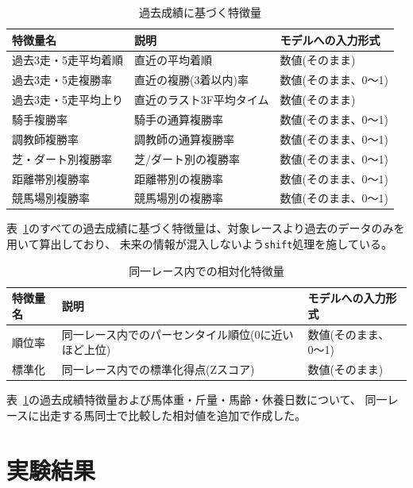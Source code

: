 \documentclass[dvipdfmx, a4paper, 11pt, titlepage]{jsarticle}
\begin{document}
\begin{table}[H]
  \centering
  \caption{過去成績に基づく特徴量}
  \label{tab:past_performance_features}
  \begin{tabular}{p{3.2cm}p{6.2cm}p{3.5cm}}
    \toprule
    特徴量名 & 説明 & モデルへの入力形式 \\
    \midrule
    過去3走・5走平均着順 & 直近の平均着順 & 数値(そのまま) \\
    過去3走・5走複勝率 & 直近の複勝(3着以内)率 & 数値(そのまま、0〜1) \\
    過去3走・5走平均上り & 直近のラスト3F平均タイム & 数値(そのまま) \\
    騎手複勝率 & 騎手の通算複勝率 & 数値(そのまま、0〜1) \\
    調教師複勝率 & 調教師の通算複勝率 & 数値(そのまま、0〜1) \\
    芝・ダート別複勝率 & 芝/ダート別の複勝率 & 数値(そのまま、0〜1) \\
    距離帯別複勝率 & 距離帯別の複勝率 & 数値(そのまま、0〜1) \\
    競馬場別複勝率 & 競馬場別の複勝率 & 数値(そのまま、0〜1) \\
    \bottomrule
  \end{tabular}
\end{table}

表~\ref{tab:past_performance_features}のすべての過去成績に基づく特徴量は、対象レースより過去のデータのみを用いて算出しており、
未来の情報が混入しないよう\texttt{shift}処理を施している。

\begin{table}[H]
  \centering
  \caption{同一レース内での相対化特徴量}
  \label{tab:relative_features}
  \begin{tabular}{p{3.2cm}p{6.2cm}p{3.5cm}}
    \toprule
    特徴量名 & 説明 & モデルへの入力形式 \\
    \midrule
    順位率 & 同一レース内でのパーセンタイル順位(0に近いほど上位) & 数値(そのまま、0〜1) \\
    標準化 & 同一レース内での標準化得点(Zスコア) & 数値(そのまま) \\
    \bottomrule
  \end{tabular}
\end{table}
表~\ref{tab:past_performance_features}の過去成績特徴量および馬体重・斤量・馬齢・休養日数について、
同一レースに出走する馬同士で比較した相対値を追加で作成した。
\section{実験結果}
\end{document}
